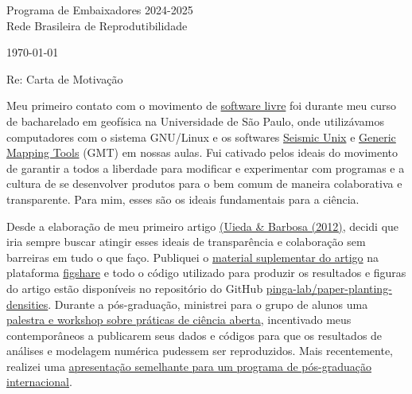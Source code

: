 \documentclass[a4paper,onecolumn,10pt]{article}
\newcommand{\Padding}{\vspace{0.5cm}}
\begin{document}
\begin{flushleft}
  Programa de Embaixadores 2024-2025
  \\
  Rede Brasileira de Reprodutibilidade
\end{flushleft}
\begin{flushright}
  \today
\end{flushright}
\Padding

\noindent
Re: Carta de Motivação
\Padding


Meu primeiro contato com o movimento de \href{https://www.fsf.org/}{software
livre} foi durante meu curso de bacharelado em geofísica na Universidade de São
Paulo,
onde utilizávamos computadores com o sistema GNU/Linux e os softwares
\href{https://en.wikipedia.org/wiki/Seismic_Unix}{Seismic Unix}
e \href{https://www.generic-mapping-tools.org/}{Generic Mapping Tools} (GMT)
em nossas aulas.
Fui cativado pelos ideais do movimento de garantir a todos a liberdade para
modificar e experimentar com programas e a cultura de se desenvolver produtos
para o bem comum de maneira colaborativa e transparente.
Para mim, esses são os ideais fundamentais para a ciência.

Desde a elaboração de meu primeiro artigo
\href{https://github.com/pinga-lab/paper-planting-densities}{(Uieda \& Barbosa
(2012)}, decidi que iria sempre buscar atingir esses ideais de transparência e
colaboração sem barreiras em tudo o que faço.
Publiquei o \href{https://doi.org/10.6084/m9.figshare.91574}{material
suplementar do artigo} na plataforma
\href{https://figshare.com/authors/Leonardo_Uieda/97471}{figshare}
e todo o código utilizado para produzir os resultados e figuras do artigo estão
disponíveis no repositório do GitHub \href{https://github.com/pinga-lab/paper-planting-densities}{pinga-lab/paper-planting-densities}.
Durante a pós-graduação, ministrei para o grupo de alunos uma
\href{https://doi.org/10.6084/m9.figshare.774537.v3}{palestra e workshop sobre
práticas de ciência aberta}, incentivado meus contemporâneos a publicarem seus
dados e códigos para que os resultados de análises e modelagem numérica
pudessem ser reproduzidos.
Mais recentemente, realizei uma
\href{https://www.leouieda.com/2022-05-06-spin-open-science/}{apresentação
semelhante para um programa de pós-graduação internacional}.
\end{document}
